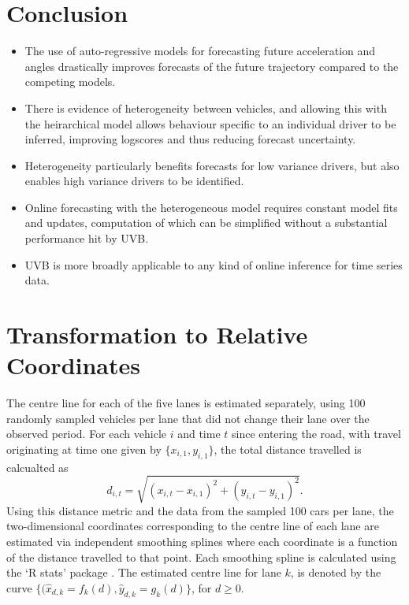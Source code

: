 \documentclass[12pt,a4paper]{article}\usepackage[]{graphicx}\usepackage[]{color}
\begin{document}
\section{Conclusion}
\label{sec:conc}
\begin{itemize}
\item The use of auto-regressive models for forecasting future acceleration and angles drastically improves forecasts of the future trajectory compared to the competing models.
\item There is evidence of heterogeneity between vehicles, and allowing this with the heirarchical model allows behaviour specific to an individual driver to be inferred, improving logscores and thus reducing forecast uncertainty. 
\item Heterogeneity particularly benefits forecasts for low variance drivers, but also enables high variance drivers to be identified.
\item Online forecasting with the heterogeneous model requires constant model fits and updates, computation of which can be simplified without a substantial performance hit by UVB.
\item UVB is more broadly applicable to any kind of online inference for time series data.
\end{itemize}

\newpage



\appendix
\section{Transformation to Relative Coordinates}

The centre line for each of the five lanes is estimated separately, using 100 randomly sampled vehicles per lane that did not change their lane over the observed period. 
For each vehicle $i$ and time $t$ since entering the road, with travel originating at time one given by $\{x_{i,1}, y_{i,1}\}$, the total distance travelled is calcualted as 
\begin{equation}
\label{distance}
d_{i, t} = \sqrt{(x_{i, t} - x_{i, 1})^2 + (y_{i, t} - y_{i, 1})^2}.
\end{equation}
Using this distance metric and the data from the sampled 100 cars per lane, the two-dimensional coordinates corresponding to the centre line of each lane are estimated via independent smoothing splines where each coordinate is a function of the distance travelled to that point. Each smoothing spline is calculated using the `R stats' package \citep{R}. The estimated centre line for lane $k$, is denoted by the curve $\{(\hat{x}_{d,k} = f_k(d), \hat{y}_{d,k} = g_k(d)\}$, for $d \geq 0$.
\\
\end{document}
